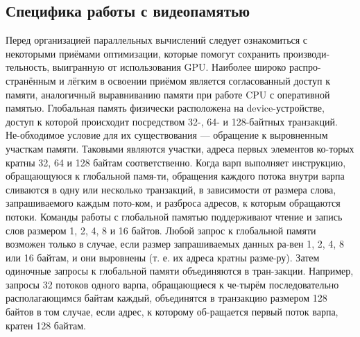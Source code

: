 \subsection{Специфика работы с видеопамятью}
Перед организацией параллельных вычислений следует ознакомиться с некоторыми приёмами оптимизации, которые помогут сохранить производи-тельность, выигранную от использования GPU. Наиболее широко распро-странённым и лёгким в освоении приёмом является согласованный доступ к памяти, аналогичный выравниванию памяти при работе CPU с оперативной памятью.
Глобальная память физически расположена на device-устройстве, доступ к которой происходит посредством 32-, 64- и 128-байтных транзакций. Не-обходимое условие для их существования — обращение к выровненным участкам памяти. Таковыми являются участки, адреса первых элементов ко-торых кратны 32, 64 и 128 байтам соответственно.
Когда варп выполняет инструкцию, обращающуюся к глобальной памя-ти, обращения каждого потока внутри варпа сливаются в одну или несколько транзакций, в зависимости от размера слова, запрашиваемого каждым пото-ком, и разброса адресов, к которым обращаются потоки.
Команды работы с глобальной памятью поддерживают чтение и запись слов размером 1, 2, 4, 8 и 16 байтов. Любой запрос к глобальной памяти возможен только в случае, если размер запрашиваемых данных ра-вен 1, 2, 4, 8 или 16 байтам, и они выровнены (т. е. их адреса кратны разме-ру).
Затем одиночные запросы к глобальной памяти объединяются в тран-закции. Например, запросы 32 потоков одного варпа, обращающиеся к че-тырём последовательно располагающимся байтам каждый, объединятся в транзакцию размером 128 байтов в том случае, если адрес, к которому об-ращается первый поток варпа, кратен 128 байтам.
